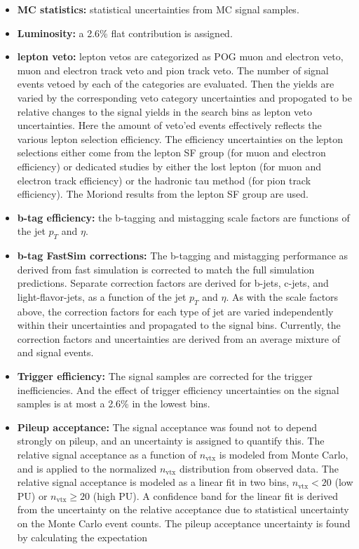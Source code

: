 \begin{itemize}
\item {\bf MC statistics:} statistical uncertainties from MC signal samples.
\item {\bf Luminosity:} a 2.6\% flat contribution is assigned.
\item {\bf lepton veto:} lepton vetos are categorized as POG muon and electron veto, muon and electron track veto and pion track veto.
The number of signal events vetoed by each of the categories are evaluated. Then the yields are varied by the corresponding veto category uncertainties and propogated to be relative changes to the signal yields in the search bins as lepton veto uncertainties. Here the amount of veto'ed events effectively reflects the various lepton selection efficiency.
The efficiency uncertainties on the lepton selections either come from the lepton SF group (for muon and electron efficiency) or dedicated studies by either the lost lepton (for muon and electron track efficiency) or the hadronic tau method (for pion track efficiency). The Moriond results from the lepton SF group are used.
\item {\bf b-tag efficiency:} the b-tagging and mistagging scale factors are functions of the jet $p_{T}$ and $\eta$.
\item {\bf b-tag FastSim corrections:} The b-tagging and mistagging performance as derived from fast simulation is corrected to match the
full simulation predictions. Separate correction factors are derived for b-jets, c-jets, and light-flavor-jets, as a function of the jet $p_{T}$ and $\eta$. As with the scale factors above, the correction factors for each type of jet are varied independently within their uncertainties and propagated to the signal bins.  Currently, the correction factors and uncertainties are derived from an average mixture of \ttbar and signal events.
\item {\bf Trigger efficiency:} The signal samples are corrected for the trigger inefficiencies. And the effect of trigger efficiency uncertainties on the signal samples is at most a 2.6\% in the lowest \MET bins.
\item {\bf Pileup acceptance:}
The signal acceptance was found not to depend strongly on pileup, and an uncertainty is assigned to quantify this. The relative signal acceptance as a function of $n_{\text{vtx}}$ is modeled from Monte Carlo, and is applied to the normalized $n_{\text{vtx}}$ distribution from observed data.
The relative signal acceptance is modeled as a linear fit in two bins, $n_{\text{vtx}} < 20$ (low PU) or $n_{\text{vtx}} \geq 20$ (high PU). A confidence band for the linear fit is derived from the uncertainty on the relative acceptance due to statistical uncertainty on the Monte Carlo event counts. The pileup acceptance uncertainty is found by calculating the expectation

\end{itemize}
